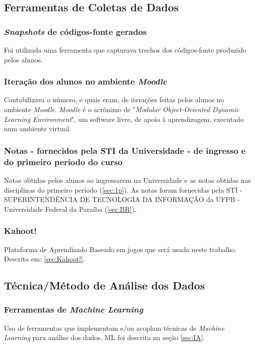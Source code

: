 \documentclass[
	12pt,				%
	openright,			%
	oneside,
	a4paper,			%
	english,			%
	french,				%
	spanish,			%
	brazil,				%
	]{abntex2}
\begin{document}
\subsection{Ferramentas de Coletas de Dados}
\label{sec:coleta}

\subsubsection{\textit{Snapshots} de códigos-fonte gerados}
\label{sec:snap}
Foi utilizada uma ferramenta que capturava trechos dos códigos-fonte produzido pelos alunos.

\subsubsection{Iteração dos alunos no ambiente \textit{Moodle}}
\label{sec:moodle}
Contabilizava o número, e quais eram, de iterações feitas pelos alunos no ambiente \textit{Moodle}. \textit{Moodle} é o acrônimo de "\textit{Modular Object-Oriented Dynamic Learning Environment}", um software livre, de apoio à aprendizagem, executado num ambiente virtual.

\subsubsection{Notas - fornecidos pela STI da Universidade - de ingresso e do primeiro período do curso}
\label{sec:notas}
Notas obtidas pelos alunos ao ingressarem na Universidade e as notas obtidas nas disciplinas do primeiro período (\ref{sec:1p}). As notas foram fornecidas pela STI - SUPERINTENDÊNCIA DE TECNOLOGIA DA INFORMAÇÃO da UFPB - Universidade Federal da Paraíba (\ref{sec:BR}).

\subsubsection{Kahoot!} 
\label{sec:Meu}
Plataforma de Aprendizado Baseado em jogos que será usada neste trabalho. Descrita em: \ref{sec:Kahoot!}.


\subsection{Técnica/Método de Análise dos Dados}
\label{sec:metodo}

\subsubsection{Ferramentas de \textit{Machine Learning}}
\label{sec:ML}
Uso de ferramentas que implementam e/ou acoplam técnicas de \textit{Machine Learning} para análise dos dados. ML foi descrita na seção \ref{sec:IA}.
\end{document}

